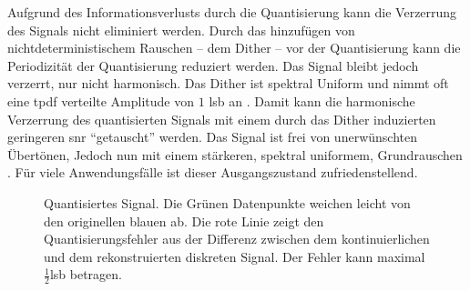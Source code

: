 Aufgrund des Informationsverlusts durch die Quantisierung kann die Verzerrung des Signals nicht eliminiert werden.
Durch das hinzufügen von nichtdeterministischem Rauschen -- dem Dither -- vor der Quantisierung kann die Periodizität der Quantisierung reduziert werden.
Das Signal bleibt jedoch verzerrt, nur nicht harmonisch.
Das Dither ist spektral Uniform und nimmt oft eine \gls{tpdf} verteilte Amplitude von $1$ \gls{lsb} an \autocite{dither}.
Damit kann die harmonische Verzerrung des quantisierten Signals mit einem durch das Dither induzierten geringeren \gls{snr} \enquote{getauscht} werden.
Das Signal ist frei von unerwünschten Übertönen, Jedoch nun mit einem stärkeren, spektral uniformem, Grundrauschen \autocites{dither}{noise-shaping}.
Für viele Anwendungsfälle ist dieser Ausgangszustand zufriedenstellend.

\begin{figure}[]
    \centering
    \caption[Quantisiertes Signal]{Quantisiertes Signal. Die Grünen Datenpunkte weichen leicht von den originellen blauen ab. Die rote Linie zeigt den Quantisierungsfehler aus der Differenz zwischen dem kontinuierlichen und dem rekonstruierten diskreten Signal. Der Fehler kann maximal $\frac{1}{2}$\gls{lsb} betragen.}
    \label{fig:quantized-signal}
\end{figure}

